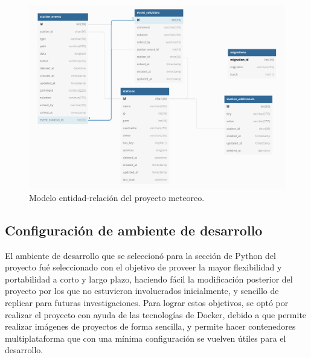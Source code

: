 \begin{figure}[!ht]
	\centering
	\includegraphics[width=1\linewidth]{images/diagrams/database_diagram.png}
	\caption{Modelo entidad-relación del proyecto meteoreo.}
	\label{fig:diagrama_base_de_datos}
\end{figure}

\pagebreak

\subsection{Configuración de ambiente de
desarrollo}\label{configuraciuxf3n-de-ambiente-de-desarrollo}

El ambiente de desarrollo que se seleccionó para la sección de Python del proyecto fué seleccionado con el objetivo de proveer la mayor flexibilidad y portabilidad a corto y largo plazo, haciendo fácil la modificación posterior del proyecto por los que no estuvieron involucrados inicialmente, y sencillo de replicar para futuras investigaciones. Para lograr estos objetivos, se optó por realizar el proyecto con ayuda de las tecnologías de Docker, debido a que permite realizar imágenes de proyectos de forma sencilla, y permite hacer contenedores multiplataforma que con una mínima configuración se vuelven útiles para el desarrollo.


